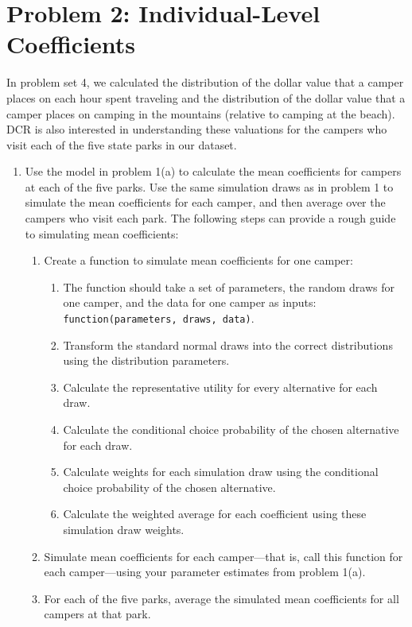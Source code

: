 \documentclass[11pt,letterpaper]{article}
\begin{document}
\section*{Problem 2: Individual-Level Coefficients}

In problem set 4, we calculated the distribution of the dollar value that a camper places on each hour spent traveling and the distribution of the dollar value that a camper places on camping in the mountains (relative to camping at the beach). DCR is also interested in understanding these valuations for the campers who visit each of the five state parks in our dataset. 

\begin{enumerate}[label=\alph*., leftmargin=*]
	\item Use the model in problem 1(a) to calculate the mean coefficients for campers at each of the five parks. Use the same simulation draws as in problem 1 to simulate the mean coefficients for each camper, and then average over the campers who visit each park. The following steps can provide a rough guide to simulating mean coefficients:
	\begin{enumerate}[label=\Roman*.]
		\item Create a function to simulate mean coefficients for one camper:
		\begin{enumerate}[label=\roman*.]
			\item The function should take a set of parameters, the random draws for one camper, and the data for one camper as inputs: \texttt{function(parameters, draws, data)}.
			\item Transform the standard normal draws into the correct distributions using the distribution parameters.
			\item Calculate the representative utility for every alternative for each draw.
			\item Calculate the conditional choice probability of the chosen alternative for each draw.
			\item Calculate weights for each simulation draw using the conditional choice probability of the chosen alternative.
			\item Calculate the weighted average for each coefficient using these simulation draw weights.
		\end{enumerate}
		\item Simulate mean coefficients for each camper---that is, call this function for each camper---using your parameter estimates from problem 1(a).
		\item For each of the five parks, average the simulated mean coefficients for all campers at that park.
	\end{enumerate}


\end{enumerate}
\end{document}
